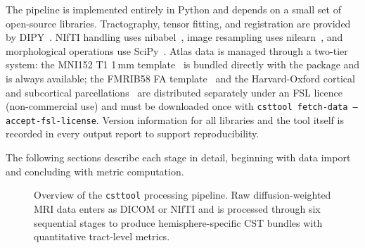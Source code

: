The pipeline is implemented entirely in Python and depends on a small set of open-source libraries. Tractography, tensor fitting, and registration are provided by DIPY~\cite{garyfallidis_dipy_2014}. NIfTI handling uses nibabel~\cite{markiewicz_2026_18944560}, image resampling uses nilearn~\cite{Nilearn}, and morphological operations use SciPy~\cite{virtanen2020scipy}. Atlas data is managed through a two-tier system: the MNI152 T1 1\,mm template~\cite{fonov2011unbiased} is bundled directly with the package and is always available; the FMRIB58 FA template~\cite{smith2006tract} and the Harvard-Oxford cortical and subcortical parcellations~\cite{jenkinson2012fsl} are distributed separately under an FSL licence (non-commercial use) and must be downloaded once with \texttt{csttool fetch-data --accept-fsl-license}. Version information for all libraries and the tool itself is recorded in every output report to support reproducibility.

The following sections describe each stage in detail, beginning with data import and concluding with metric computation.

\begin{figure}[htbp]
	\centering
	\caption{Overview of the \texttt{csttool} processing pipeline. Raw diffusion-weighted MRI data enters as DICOM or NIfTI and is processed through six sequential stages to produce hemisphere-specific CST bundles with quantitative tract-level metrics.}
	\label{fig:pipeline_overview}
\end{figure}

